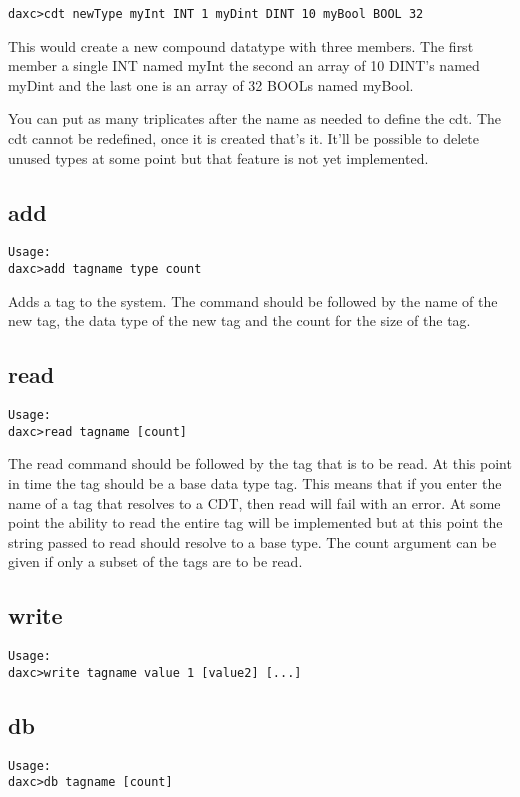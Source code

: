 \begin{verbatim}
daxc>cdt newType myInt INT 1 myDint DINT 10 myBool BOOL 32
\end{verbatim}

This would create a new compound datatype with three members.  The first member a single INT named myInt the second an array of 10 DINT's named myDint and the last one is an array of 32 BOOLs named myBool.

You can put as many triplicates after the name as needed to define the cdt.  The cdt cannot be redefined, once it is created that's it.  It'll be possible to delete unused types at some point but that feature is not yet implemented.

\subsection{add}
\begin{verbatim}
Usage:
daxc>add tagname type count
\end{verbatim}

Adds a tag to the system.  The command should be followed by the name of the new tag, the data type of the new tag and the count for the size of the tag.

\subsection{read}
\begin{verbatim}
Usage:
daxc>read tagname [count]
\end{verbatim}

The read command should be followed by the tag that is to be read.  At this point in time the tag should be a base data type tag.  This means that if you enter the name of a tag that resolves to a CDT, then read will fail with an error.  At some point the ability to read the entire tag will be implemented but at this point the string passed to read should resolve to a base type.  The count argument can be given if only a subset of the tags are to be read.

\subsection{write}
\begin{verbatim}
Usage:
daxc>write tagname value 1 [value2] [...]
\end{verbatim}

\subsection{db}
\begin{verbatim}
Usage:
daxc>db tagname [count]
\end{verbatim}

